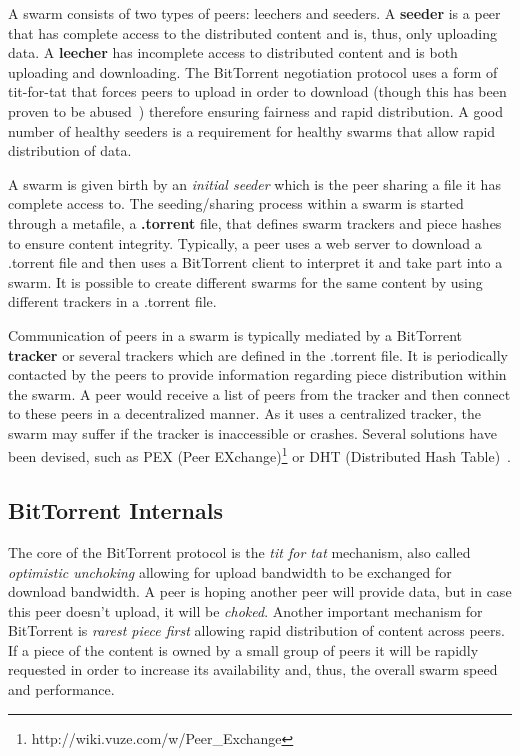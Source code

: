 A swarm consists of two types of peers: leechers and seeders. A
\textbf{seeder} is a peer that has complete access to the distributed content
and is, thus, only uploading data. A \textbf{leecher} has incomplete access to
distributed content and is both uploading and downloading. The BitTorrent
negotiation protocol uses a form of tit-for-tat that forces peers to upload in
order to download (though this has been proven to be
abused~\cite{free-riding}) therefore ensuring fairness and rapid distribution.
A good number of healthy seeders is a requirement for healthy swarms that
allow rapid distribution of data.

A swarm is given birth by an \textit{initial seeder} which is the peer sharing
a file it has complete access to. The seeding/sharing process within a swarm
is started through a metafile, a \textbf{.torrent} file, that defines swarm
trackers and piece hashes to ensure content integrity. Typically, a peer uses
a web server to download a .torrent file and then uses a BitTorrent client to
interpret it and take part into a swarm. It is possible to create different
swarms for the same content by using different trackers in a .torrent file.

Communication of peers in a swarm is typically mediated by a BitTorrent
\textbf{tracker} or several trackers which are defined in the .torrent file.
It is periodically contacted by the peers to provide information regarding
piece distribution within the swarm. A peer would receive a list of peers from
the tracker and then connect to these peers in a decentralized manner. As it
uses a centralized tracker, the swarm may suffer if the tracker is
inaccessible or crashes. Several solutions have been devised, such as PEX
(Peer EXchange)\footnote{http://wiki.vuze.com/w/Peer\_Exchange} or DHT (Distributed Hash Table)~\cite{dht-paper}.


\subsection{BitTorrent Internals}

The core of the BitTorrent protocol is the \textit{tit for tat} mechanism,
also called \textit{optimistic unchoking} allowing for upload bandwidth to be
exchanged for download bandwidth. A peer is hoping another peer will provide
data, but in case this peer doesn't upload, it will be \textit{choked}.
Another important mechanism for BitTorrent is \textit{rarest piece first}
allowing rapid distribution of content across peers. If a piece of the content
is owned by a small group of peers it will be rapidly requested in order to
increase its availability and, thus, the overall swarm speed and performance.

